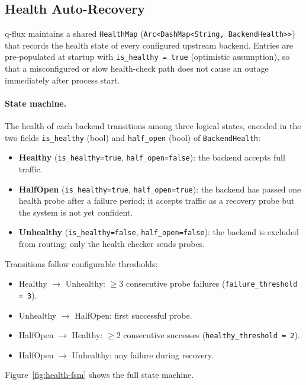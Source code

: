 \documentclass[a4paper, 11pt]{article}
\begin{document}
\subsection{Health Auto-Recovery}
\label{sec:health}

q-flux maintains a shared \texttt{HealthMap} (\texttt{Arc<DashMap<String,
BackendHealth>>}) that records the health state of every configured upstream
backend.  Entries are pre-populated at startup with \texttt{is\_healthy = true}
(optimistic assumption), so that a misconfigured or slow health-check path does
not cause an outage immediately after process start.

\paragraph{State machine.}  The health of each backend transitions among three
logical states, encoded in the two fields \texttt{is\_healthy} (bool) and
\texttt{half\_open} (bool) of \texttt{BackendHealth}:

\begin{itemize}
  \item \textbf{Healthy} (\texttt{is\_healthy=true}, \texttt{half\_open=false}):
        the backend accepts full traffic.
  \item \textbf{HalfOpen} (\texttt{is\_healthy=true}, \texttt{half\_open=true}):
        the backend has passed one health probe after a failure period; it
        accepts traffic as a recovery probe but the system is not yet confident.
  \item \textbf{Unhealthy} (\texttt{is\_healthy=false}, \texttt{half\_open=false}):
        the backend is excluded from routing; only the health checker sends probes.
\end{itemize}

Transitions follow configurable thresholds:
\begin{itemize}
  \item Healthy $\to$ Unhealthy: $\geq 3$ consecutive probe failures
        (\texttt{failure\_threshold = 3}).
  \item Unhealthy $\to$ HalfOpen: first successful probe.
  \item HalfOpen $\to$ Healthy: $\geq 2$ consecutive successes
        (\texttt{healthy\_threshold = 2}).
  \item HalfOpen $\to$ Unhealthy: any failure during recovery.
\end{itemize}
Figure~\ref{fig:health-fsm} shows the full state machine.
\end{document}
